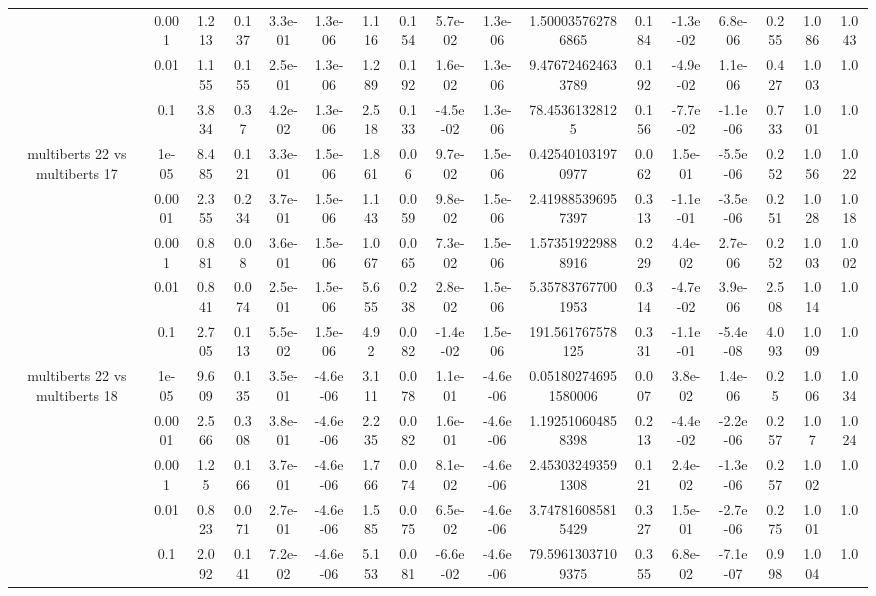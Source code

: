 \begin{tabular}{|c|c|c|c|c|c|c|c|c|c|c|c|c|c|c|c|c|}
 & 0.001 & 1.213 & 0.137 & 3.3e-01 & 1.3e-06 & 1.116 & 0.154 & 5.7e-02 & 1.3e-06 & 1.500035762786865 & 0.184 & -1.3e-02 & 6.8e-06 & 0.255 & 1.086 & 1.043 \\
 & 0.01 & 1.155 & 0.155 & 2.5e-01 & 1.3e-06 & 1.289 & 0.192 & 1.6e-02 & 1.3e-06 & 9.476724624633789 & 0.192 & -4.9e-02 & 1.1e-06 & 0.427 & 1.003 & 1.0 \\
 & 0.1 & 3.834 & 0.37 & 4.2e-02 & 1.3e-06 & 2.518 & 0.133 & -4.5e-02 & 1.3e-06 & 78.45361328125 & 0.156 & -7.7e-02 & -1.1e-06 & 0.733 & 1.001 & 1.0 \\
\hline
\multirow{5}{*}{multiberts 22 vs multiberts 17} & 1e-05 & 8.485 & 0.121 & 3.3e-01 & 1.5e-06 & 1.861 & 0.06 & 9.7e-02 & 1.5e-06 & 0.425401031970977 & 0.062 & 1.5e-01 & -5.5e-06 & 0.252 & 1.056 & 1.022 \\
 & 0.0001 & 2.355 & 0.234 & 3.7e-01 & 1.5e-06 & 1.143 & 0.059 & 9.8e-02 & 1.5e-06 & 2.419885396957397 & 0.313 & -1.1e-01 & -3.5e-06 & 0.251 & 1.028 & 1.018 \\
 & 0.001 & 0.881 & 0.08 & 3.6e-01 & 1.5e-06 & 1.067 & 0.065 & 7.3e-02 & 1.5e-06 & 1.573519229888916 & 0.229 & 4.4e-02 & 2.7e-06 & 0.252 & 1.003 & 1.002 \\
 & 0.01 & 0.841 & 0.074 & 2.5e-01 & 1.5e-06 & 5.655 & 0.238 & 2.8e-02 & 1.5e-06 & 5.357837677001953 & 0.314 & -4.7e-02 & 3.9e-06 & 2.508 & 1.014 & 1.0 \\
 & 0.1 & 2.705 & 0.113 & 5.5e-02 & 1.5e-06 & 4.92 & 0.082 & -1.4e-02 & 1.5e-06 & 191.561767578125 & 0.331 & -1.1e-01 & -5.4e-08 & 4.093 & 1.009 & 1.0 \\
\hline
\multirow{5}{*}{multiberts 22 vs multiberts 18} & 1e-05 & 9.609 & 0.135 & 3.5e-01 & -4.6e-06 & 3.111 & 0.078 & 1.1e-01 & -4.6e-06 & 0.051802746951580006 & 0.007 & 3.8e-02 & 1.4e-06 & 0.25 & 1.006 & 1.034 \\
 & 0.0001 & 2.566 & 0.308 & 3.8e-01 & -4.6e-06 & 2.235 & 0.082 & 1.6e-01 & -4.6e-06 & 1.192510604858398 & 0.213 & -4.4e-02 & -2.2e-06 & 0.257 & 1.07 & 1.024 \\
 & 0.001 & 1.25 & 0.166 & 3.7e-01 & -4.6e-06 & 1.766 & 0.074 & 8.1e-02 & -4.6e-06 & 2.453032493591308 & 0.121 & 2.4e-02 & -1.3e-06 & 0.257 & 1.002 & 1.0 \\
 & 0.01 & 0.823 & 0.071 & 2.7e-01 & -4.6e-06 & 1.585 & 0.075 & 6.5e-02 & -4.6e-06 & 3.747816085815429 & 0.327 & 1.5e-01 & -2.7e-06 & 0.275 & 1.001 & 1.0 \\
 & 0.1 & 2.092 & 0.141 & 7.2e-02 & -4.6e-06 & 5.153 & 0.081 & -6.6e-02 & -4.6e-06 & 79.59613037109375 & 0.355 & 6.8e-02 & -7.1e-07 & 0.998 & 1.004 & 1.0 \\

\end{tabular}
